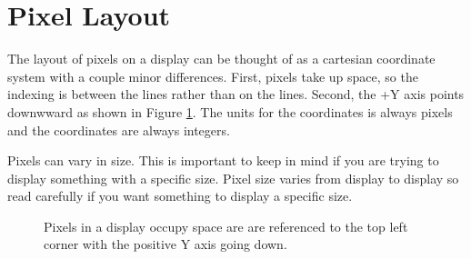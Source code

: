 \section{Pixel Layout}
The layout of pixels on a display can be thought of as a cartesian coordinate system with a couple 
minor differences. First, pixels take up space, so the indexing is between the lines rather than 
on the lines. Second, the +Y axis points downwward as shown in Figure \ref{fig:pixels}. The units
for the coordinates is always pixels and the coordinates are always integers. 

Pixels can vary in size. This is important to keep in mind if you are trying to display something
with a specific size. Pixel size varies from display to display so read carefully if you want 
something to display a specific size.

\newcommand*{\xMin}{0}%
\newcommand*{\xMax}{6}%
\newcommand*{\yMin}{0}%
\newcommand*{\yMax}{6}%
\begin{figure}[!htb]
	\centering
	\caption{Pixels in a display occupy space are are referenced to the top left corner with the positive Y axis going down.}
	\label{fig:pixels}
\end{figure}


